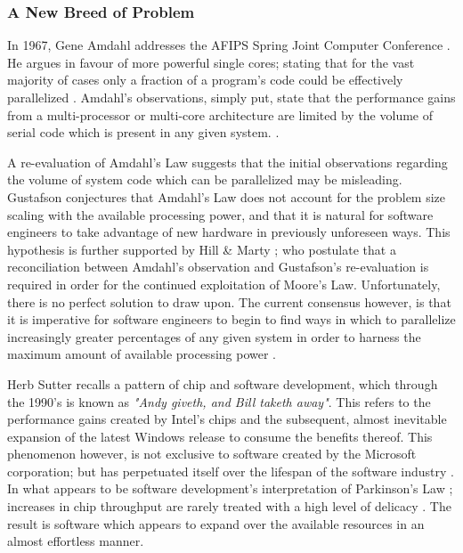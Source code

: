 \documentclass[12pt,a4paper]{article}
\begin{document}
\subsubsection{A New Breed of Problem}

In 1967, Gene Amdahl addresses the AFIPS Spring Joint Computer Conference \cite{amdahl}. He argues in favour of more powerful single cores; stating that for the vast majority of cases only a fraction of a program's code could be effectively parallelized \cite{amdahl}. Amdahl's observations, simply put, state that the performance gains from a multi-processor or multi-core architecture are limited by the volume of serial code which is present in any given system. \cite{thousandCoreChips}.

A re-evaluation of Amdahl's Law \cite{reevaluateAmdahl} suggests that the initial observations regarding the volume of system code which can be parallelized may be misleading. Gustafson \cite{reevaluateAmdahl} conjectures that Amdahl's Law does not account for the problem size scaling with the available processing power, and that it is natural for software engineers to take advantage of new hardware in previously unforeseen ways. This hypothesis is further supported by Hill \& Marty \cite{amdahlsLawMultiCore}; who postulate that a reconciliation between Amdahl's observation and Gustafson's re-evaluation is required in order for the continued exploitation of Moore's Law. Unfortunately, there is no perfect solution to draw upon. The current consensus however, is that it is imperative for software engineers to begin to find ways in which to parallelize increasingly greater percentages of any given system in order to harness the maximum amount of available processing power \cite{reevaluateAmdahl,thousandCoreChips,amdahlsLawMultiCore}.

Herb Sutter \cite{theFreeLunchIsOver} recalls a pattern of chip and software development, which through the 1990's is known as \textit{"Andy giveth, and Bill taketh away"}. This refers to the performance gains created by Intel's chips and the subsequent, almost inevitable expansion of the latest Windows release to consume the benefits thereof. This phenomenon however, is not exclusive to software created by the Microsoft corporation; but has perpetuated itself over the lifespan of the software industry \cite{theFreeLunchIsOver}. In what appears to be software development's interpretation of Parkinson's Law \cite{parkinsonsLaw}; increases in chip throughput are rarely treated with a high level of delicacy \cite{theFreeLunchIsOver}. The result is software which appears to expand over the available resources in an almost effortless manner.
\end{document}
